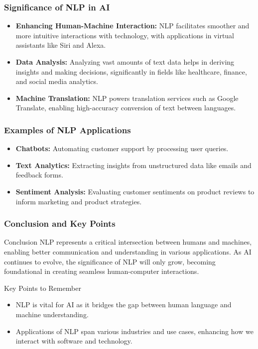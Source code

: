 \documentclass{beamer}
\begin{document}
\begin{frame}[fragile]
    \frametitle{Significance of NLP in AI}
    \begin{itemize}
        \item \textbf{Enhancing Human-Machine Interaction:} NLP facilitates smoother and more intuitive interactions with technology, with applications in virtual assistants like Siri and Alexa.
        \item \textbf{Data Analysis:} Analyzing vast amounts of text data helps in deriving insights and making decisions, significantly in fields like healthcare, finance, and social media analytics.
        \item \textbf{Machine Translation:} NLP powers translation services such as Google Translate, enabling high-accuracy conversion of text between languages.
    \end{itemize}
\end{frame}

\begin{frame}[fragile]
    \frametitle{Examples of NLP Applications}
    \begin{itemize}
        \item \textbf{Chatbots:} Automating customer support by processing user queries.
        \item \textbf{Text Analytics:} Extracting insights from unstructured data like emails and feedback forms.
        \item \textbf{Sentiment Analysis:} Evaluating customer sentiments on product reviews to inform marketing and product strategies.
    \end{itemize}
\end{frame}

\begin{frame}[fragile]
    \frametitle{Conclusion and Key Points}
    \begin{block}{Conclusion}
        NLP represents a critical intersection between humans and machines, enabling better communication and understanding in various applications. As AI continues to evolve, the significance of NLP will only grow, becoming foundational in creating seamless human-computer interactions.
    \end{block}
    
    \begin{block}{Key Points to Remember}
        \begin{itemize}
            \item NLP is vital for AI as it bridges the gap between human language and machine understanding.
            \item Applications of NLP span various industries and use cases, enhancing how we interact with software and technology.
        \end{itemize}
    \end{block}
\end{frame}
\end{document}
